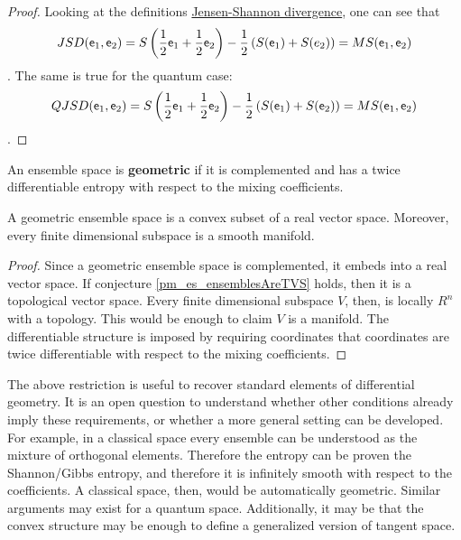 \begin{proof}
	Looking at the definitions \href{https://en.wikipedia.org/wiki/Jensen%E2%80%93Shannon_divergence}{Jensen-Shannon divergence}, one can see that
	$$ JSD(\mathsf{e}_1, \mathsf{e}_2) = S\left(\frac{1}{2}\mathsf{e}_1 + \frac{1}{2}\mathsf{e}_2 \right)  - \frac{1}{2} \left(S(\mathsf{e}_1) + S(e_2)\right) = MS(\mathsf{e}_1, \mathsf{e}_2)$$.
	The same is true for the quantum case:
	$$ QJSD(\mathsf{e}_1, \mathsf{e}_2) = S\left(\frac{1}{2}\mathsf{e}_1 + \frac{1}{2}\mathsf{e}_2 \right)  - \frac{1}{2} \left(S(\mathsf{e}_1) + S(\mathsf{e}_2)\right) = MS(\mathsf{e}_1, \mathsf{e}_2)$$.
\end{proof}

\begin{defn}
	An ensemble space is \textbf{geometric} if it is complemented and has a twice differentiable entropy with respect to the mixing coefficients.
\end{defn}

\begin{conj}
	A geometric ensemble space is a convex subset of a real vector space. Moreover, every finite dimensional subspace is a smooth manifold.
\end{conj}

\begin{proof}
	Since a geometric ensemble space is complemented, it embeds into a real vector space. If conjecture \ref{pm_es_ensemblesAreTVS} holds, then it is a topological vector space. Every finite dimensional subspace $V$, then, is locally $R^n$ with a topology. This would be enough to claim $V$ is a manifold. The differentiable structure is imposed by requiring coordinates that coordinates are twice differentiable with respect to the mixing coefficients.
\end{proof}

\begin{remark}
	The above restriction is useful to recover standard elements of differential geometry. It is an open question to understand whether other conditions already imply these requirements, or whether a more general setting can be developed. For example, in a classical space every ensemble can be understood as the mixture of orthogonal elements. Therefore the entropy can be proven the Shannon/Gibbs entropy, and therefore it is infinitely smooth with respect to the coefficients. A classical space, then, would be automatically geometric. Similar arguments may exist for a quantum space. Additionally, it may be that the convex structure may be enough to define a generalized version of tangent space.
\end{remark}

